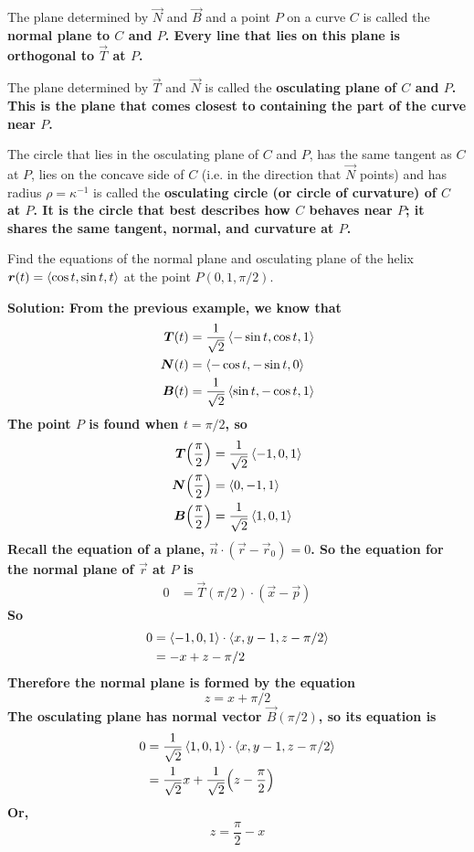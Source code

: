 The plane determined by \(\vec N\) and \(\vec B\) and a point \(P\) on a curve \(C\) is called the \bf{normal plane} to \(C\) and \(P\). Every line that lies on this plane is orthogonal to \(\vec T\) at \(P\). \par The plane determined by \(\vec T\) and \(\vec N\) is called the \bf{osculating plane} of \(C\) and \(P\). This is the plane that comes closest to containing the part of the curve near \(P\). \par The circle that lies in the osculating plane of \(C\) and \(P\), has the same tangent as \(C\) at \(P\), lies on the concave side of \(C\) (i.e. in the direction that \(\vec N\) points) and has radius \(\rho = \kappa^{-1}\) is called the \bf{osculating circle} (or \bf{circle of curvature}) of \(C\) at \(P\). It is the circle that best describes how \(C\) behaves near \(P\); it shares the same tangent, normal, and curvature at \(P\).
\begin{example}
    Find the equations of the normal plane and osculating plane of the helix \(\boldsymbol{r}(t) = \left\langle\cos t, \sin t, t\right\rangle\) at the point \(P(0, 1, \pi/2)\).\par\bf{Solution: }From the previous example, we know that
    \begin{align*}
        \boldsymbol{T}(t) &= \frac{1}{\sqrt 2}\left\langle-\sin t, \cos t, 1\right\rangle \\
        \boldsymbol{N}(t) &= \left\langle-\cos t, -\sin t, 0\right\rangle \\
        \boldsymbol{B}(t) &= \frac{1}{\sqrt 2}\left\langle\sin t, -\cos t, 1\right\rangle
    \end{align*}
    The point \(P\) is found when \(t = \pi /2\), so
    \begin{align*}
        \vec T\pqty{\frac{\pi}2} &= \frac{1}{\sqrt 2}\<-1, 0, 1\> \\
        \vec N\pqty{\frac{\pi}2} &= \<0, -1, 1\> \\
        \vec B\pqty{\frac{\pi}2} &= \frac{1}{\sqrt 2}\<1, 0, 1\>
    \end{align*}
    Recall the equation of a plane, \(\vec n \cdot (\vec r - \vec r_0) = 0\). So the equation for the normal plane of \(\vec r\) at \(P\) is
    \begin{align*}
        0 &= \vec T(\pi/2)
        \cdot (\vec x - \vec p)
    \end{align*}
    So
    \begin{align*}
        0 &= \left\langle-1, 0, 1\right\rangle\cdot\left\langle x, y-1, z-\pi/2\right\rangle \\
        &= -x+z-\pi/2
    \end{align*}
    Therefore the normal plane is formed by the equation
    \[ z = x+\pi/2\]
    The osculating plane has normal vector \(\vec B(\pi/2)\), so its equation is
    \begin{align*}
        0 &= \frac{1}{\sqrt{2}}\<1, 0, 1\> \cdot \<x, y-1, z-\pi/2\> \\
        &= \frac{1}{\sqrt 2}x + \frac{1}{\sqrt 2}\pqty{z-\frac{\pi}2}
    \end{align*}
    Or,
    \[ z = \frac{\pi}2 - x\]
\end{example}
